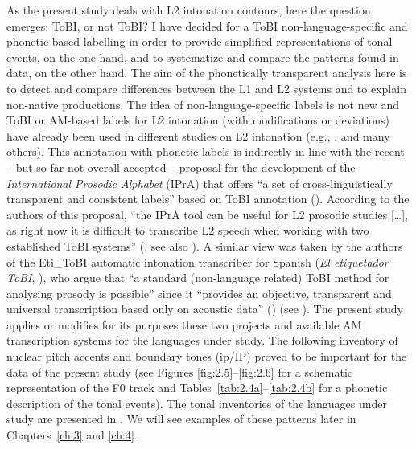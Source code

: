 \begin{sloppypar}
As the present study deals with L2 intonation contours, here the question emerges: ToBI, or not ToBI? I have decided for a ToBI non-language-specific and phonetic-based labelling in order to provide simplified representations of tonal events, on the one hand, and to systematize and compare the patterns found in data, on the other hand. The aim of the phonetically transparent analysis here is to detect and compare differences between the L1 and L2 systems and to explain non-native productions. The idea of non-language-specific labels is not new and ToBI or AM-based labels for L2 intonation (with modifications or deviations) have already been used in different studies on L2 intonation (e.g., \citealt{JunOh2000, MennenEtAl2012, Mennen2015, AstrucVanrell2016, ColantoniEtAl2016a}, and many others). This annotation with phonetic labels is indirectly in line with the recent -- but so far not overall accepted -- proposal for the development of the \textit{International Prosodic Alphabet} (IPrA) that offers “a set of cross-linguistically transparent and consistent labels” based on ToBI annotation (\citealt[1]{HualdePrieto2016}). According to the authors of this proposal, “the IPrA tool can be useful for L2 prosodic studies […], as right now it is difficult to transcribe L2 speech when working with two established ToBI systems” (\citealt[19]{HualdePrieto2016}, see also \citealt{JunFletcher2014}). A similar view was taken by the authors of the Eti\_ToBI automatic intonation transcriber for Spanish (\textit{El etiquetador ToBI}, \citealt{Elvira-GarcíaEtAl2016}), who argue that “a standard (non-language related) ToBI method for analysing prosody is possible” since it “provides an objective, transparent and universal transcription based only on acoustic data” (\citealt[785]{Elvira-GarcíaEtAl2016}) (see ). The present study applies or modifies for its purposes these two projects and available AM transcription systems for the languages under study. The following inventory of nuclear pitch accents and boundary tones (ip/IP) proved to be important for the data of the present study (see Figures \ref{fig:2.5}--\ref{fig:2.6} for a schematic representation of the F0 track and Tables~\ref{tab:2.4a}--\ref{tab:2.4b} for a phonetic description of the tonal events). The tonal inventories of the languages under study are presented in . We will see examples of these patterns later in Chapters~\ref{ch:3} and \ref{ch:4}.
\end{sloppypar}


